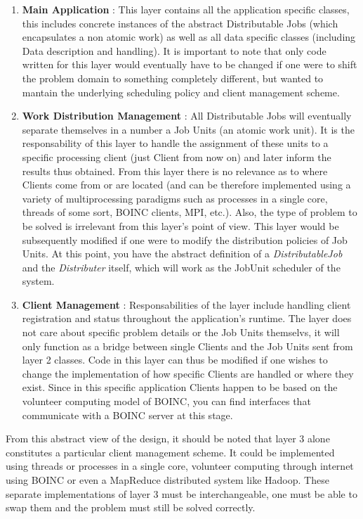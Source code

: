 \documentclass[a4paper]{article}
\begin{document}
\begin{enumerate}
 \item \textbf{Main Application} : This layer contains all the application specific classes, this includes concrete instances of the abstract Distributable Jobs (which encapsulates a non atomic work) as well as all data specific classes (including Data description and handling). It is important to note that only code written for this layer would eventually have to be changed if one were to shift the problem domain to something completely different, but wanted to mantain the underlying scheduling policy and client management scheme.

 \item \textbf{Work Distribution Management} : All Distributable Jobs will eventually separate themselves in a number a Job Units (an atomic work unit). It is the responsability of this layer to handle the assignment of these units to a specific processing client (just Client from now on) and later inform the results thus obtained. From this layer there is no relevance as to where Clients come from or are located (and can be therefore implemented using a variety of multiprocessing paradigms such as processes in a single core, threads of some sort, BOINC clients, MPI, etc.). Also, the type of problem to be solved is irrelevant from this layer's point of view. This layer would be subsequently modified if one were to modify the distribution policies of Job Units. At this point, you have the abstract definition of a \textit{DistributableJob} and the \textit{Distributer} itself, which will work as the JobUnit scheduler of the system.

 \item \textbf{Client Management} : Responsabilities of the layer include handling client registration and status throughout the application's runtime. The layer does not care about specific problem details or the Job Units themselvs, it will only function as a bridge between single Clients and the Job Units sent from layer 2 classes. Code in this layer can thus be modified if one wishes to change the implementation of how specific Clients are handled or where they exist. Since in this specific application Clients happen to be based on the volunteer computing model of BOINC, you can find interfaces that communicate with a BOINC server at this stage.
\end{enumerate}

From this abstract view of the design, it should be noted that layer 3 alone constitutes a particular client management scheme. It could be implemented using threads or processes in a single core, volunteer computing through internet using BOINC or even a MapReduce distributed system like Hadoop. These separate implementations of layer 3 must be interchangeable, one must be able to swap them and the problem must still be solved correctly.
\end{document}
